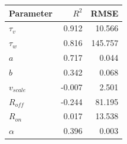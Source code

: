 \begin{tabular}{lrr}
\toprule
Parameter & $R^2$ & RMSE \\
\midrule
$\tau_v$ & 0.912 & 10.566 \\
$\tau_w$ & 0.816 & 145.757 \\
$a$ & 0.717 & 0.044 \\
$b$ & 0.342 & 0.068 \\
$v_{scale}$ & -0.007 & 2.501 \\
$R_{off}$ & -0.244 & 81.195 \\
$R_{on}$ & 0.017 & 13.538 \\
$\alpha$ & 0.396 & 0.003 \\
\bottomrule
\end{tabular}